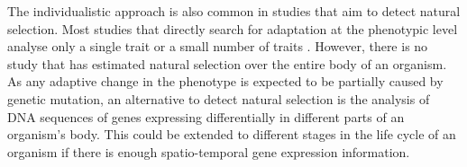 The individualistic approach is also common in studies that aim to detect natural selection. Most studies that directly search for adaptation at the phenotypic level analyse only a single trait or a small number of traits \citep{Hoekstra2001,Hereford2004}. However, there is no study that has estimated natural selection over the entire body of an organism.
As any adaptive change in the phenotype is expected to be partially caused by genetic mutation, an alternative to detect natural selection is the analysis of DNA sequences of genes expressing differentially in different parts of an organism's body. This could be extended to different stages in the life cycle of an organism if there is enough spatio-temporal gene expression information.




%
%

